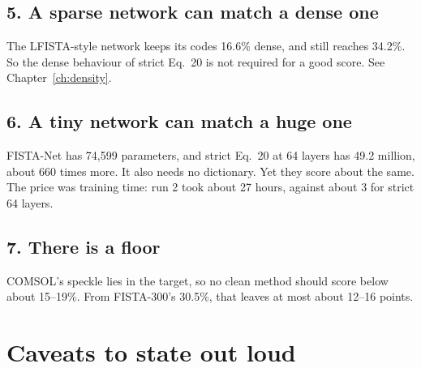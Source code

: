\subsection*{5. A sparse network can match a dense one}

The LFISTA-style network keeps its codes 16.6\% dense, and still reaches 34.2\%. So the dense behaviour of strict
Eq.~20 is not required for a good score. See Chapter~\ref{ch:density}.

\subsection*{6. A tiny network can match a huge one}

FISTA-Net has 74,599 parameters, and strict Eq.~20 at 64 layers has 49.2 million, about 660 times more. It also needs no
dictionary. Yet they score about the same. The price was training time: run 2 took about 27 hours, against about 3 for
strict 64 layers.

\subsection*{7. There is a floor}

COMSOL's speckle lies in the target, so no clean method should score below about 15--19\%. From FISTA-300's 30.5\%, that
leaves at most about 12--16 points.

\section{Caveats to state out loud}


